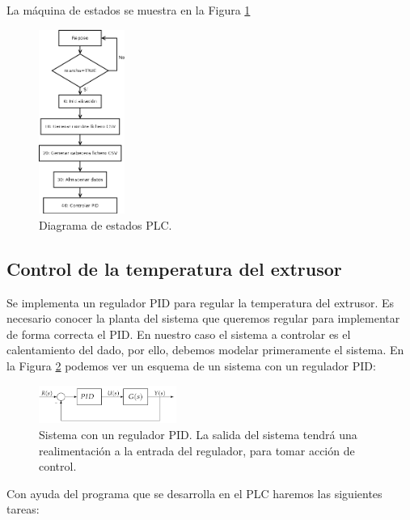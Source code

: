 La máquina de estados se muestra en la Figura \ref{fig:plc_estados}

\begin{figure}[H]
    \centering
    \includegraphics[width=0.25\textwidth]{images/PLC/diagrama.png}
    \caption[Diagrama de estados PLC.]{Diagrama de estados PLC.}
    \label{fig:plc_estados}
\end{figure}

\subsection{Control de la temperatura del extrusor}
\label{sec:plc_PID}

Se implementa un regulador PID para regular la temperatura del extrusor. Es necesario conocer la planta del sistema que queremos regular para implementar de forma correcta el PID. En nuestro caso el sistema a controlar es el calentamiento del dado, por ello, debemos modelar primeramente el sistema. En la Figura \ref{fig:plc_sistema} podemos ver un esquema de un sistema con un regulador PID:

\begin{figure}[H]
    \centering
    \includegraphics[width=0.4\textwidth]{images/PLC/sistema.png}
    \caption[Sistema con un regulador PID.]{Sistema con un regulador PID. La salida del sistema tendrá una realimentación a la entrada del regulador, para tomar acción de control.}
    \label{fig:plc_sistema}
\end{figure}

Con ayuda del programa que se desarrolla en el PLC haremos las siguientes tareas:

